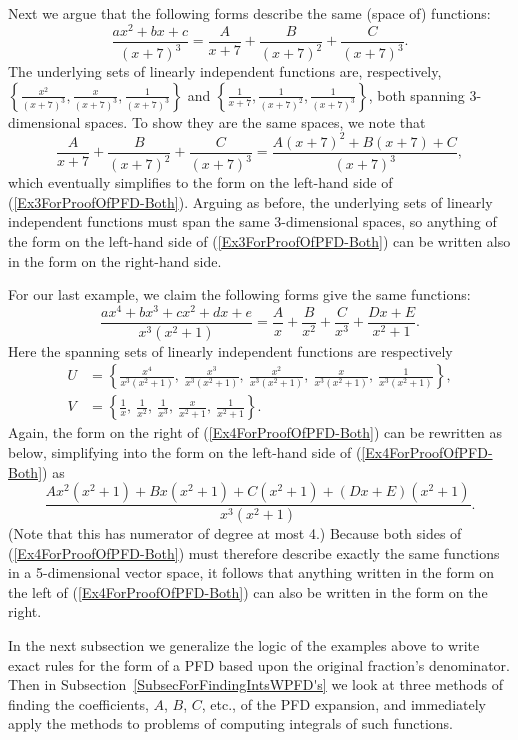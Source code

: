 \bex Next we argue that the following forms describe the same (space of)
functions:
\begin{equation}
\frac{ax^2+bx+c}{(x+7)^3}
  =\frac{A}{x+7}+\frac{B}{(x+7)^2}+\frac{C}{(x+7)^3}.
\label{Ex3ForProofOfPFD-Both}
\end{equation}
The underlying sets of linearly independent functions are, 
respectively,
$\left\{\frac{x^2}{(x+7)^3},\frac{x}{(x+7)^3},\frac1{(x+7)^3}\right\}$
and
$\left\{\frac1{x+7},\frac1{(x+7)^2},\frac1{(x+7)^3}\right\}$,
both spanning 3-dimensional spaces.  To show they are the same
spaces, we note that
$$\frac{A}{x+7}+\frac{B}{(x+7)^2}+\frac{C}{(x+7)^3}
  =\frac{A(x+7)^2+B(x+7)+C}{(x+7)^3},$$
which eventually simplifies to the form on the left-hand side of 
(\ref{Ex3ForProofOfPFD-Both}). Arguing as before, the underlying
sets of linearly independent functions must span the same
3-dimensional spaces, so anything of the form on the left-hand side
of (\ref{Ex3ForProofOfPFD-Both}) can be written also in the
form on the right-hand side.
\eex

\bex For our last example, we claim the following
forms give the same functions:
\begin{equation}
\frac{ax^4+bx^3+cx^2+dx+e}{x^3(x^2+1)}
=\frac{A}x+\frac{B}{x^2}+\frac{C}{x^3}+\frac{Dx+E}{x^2+1}.
\label{Ex4ForProofOfPFD-Both}
\end{equation}
Here the spanning sets of linearly independent functions are respectively
\begin{align*}
U&=\left\{\frac{x^4}{x^3(x^2+1)},\ \frac{x^3}{x^3(x^2+1)},\ 
\frac{x^2}{x^3(x^2+1)},\ \frac{x}{x^3(x^2+1)},\ \frac{1}{x^3(x^2+1)}\right\},\\
V&=\left\{\frac1x,\ \frac1{x^2},\ \frac1{x^3},\ \frac{x}{x^2+1},\ \frac1{x^2+1}
   \right\}.
\end{align*}
Again, the form on the right of (\ref{Ex4ForProofOfPFD-Both})
can be rewritten as below, simplifying into the form on the left-hand
side of (\ref{Ex4ForProofOfPFD-Both}) as
$$\frac{Ax^2(x^2+1)+Bx(x^2+1)+C(x^2+1)+(Dx+E)(x^2+1)}{x^3(x^2+1)}.$$
(Note that this  has numerator of degree at most 4.)
Because both sides of 
(\ref{Ex4ForProofOfPFD-Both}) must therefore
describe exactly the same functions
in a 5-dimensional vector space, it follows that anything
written in the form on the left of (\ref{Ex4ForProofOfPFD-Both})
can also be written in the form on the right.
\eex

In the next subsection we generalize the logic of
the examples above to write exact rules for the 
form of a PFD based upon the original fraction's denominator.  
Then in Subsection~\ref{SubsecForFindingIntsWPFD's}
we look at three methods of finding
the coefficients, $A$, $B$, $C$, etc., of the PFD expansion,
and immediately apply the methods to problems of computing integrals of
such functions.
\newpage
